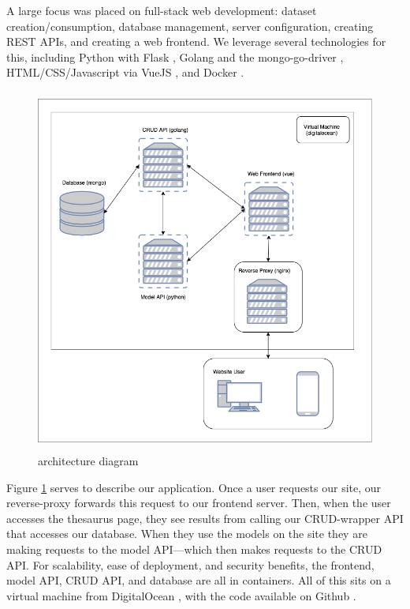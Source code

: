 \documentclass[11pt, twoside, reqno]{book}
\begin{document}
A large focus was placed on full-stack web development: dataset creation/consumption, database management, server configuration, creating REST APIs, and creating a web frontend. We leverage several technologies for this, including Python with Flask \cite{Welcomet33:online}, Golang and the mongo-go-driver \cite{mongogod83:online}, HTML/CSS/Javascript via VueJS \cite{Vuejs17:online}, and Docker \cite{Empoweri41:online}.
\newpage
\begin{figure}[h!]
  \centering
  \includegraphics[width=15cm, height=12cm, keepaspectratio]{architecture.png}
  
  \caption{architecture diagram}
  \label{fig:architecture}
\end{figure}

Figure \ref{fig:architecture} serves to describe our application. Once a user requests our site, our reverse-proxy forwards this request to our frontend server. Then, when the user accesses the thesaurus page, they see results from calling our CRUD-wrapper API that accesses our database. When they use the models on the site they are making requests to the model API—which then makes requests to the CRUD API. For scalability, ease of deployment, and security benefits, the frontend, model API, CRUD API, and database are all in containers. All of this sits on a virtual machine from DigitalOcean \cite{DigitalO1:online}, with the code available on Github \cite{GitHub86:online}.
\end{document}
